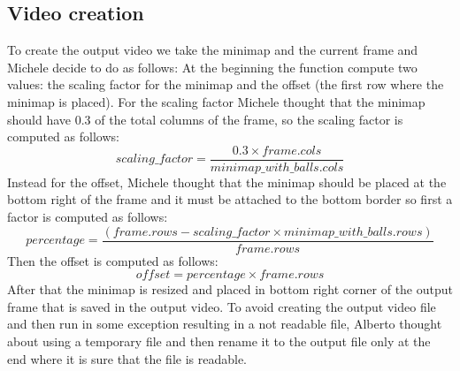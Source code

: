 \subsection{Video creation}
To create the output video we take the minimap and the current frame and Michele decide to do as follows:
At the beginning the function compute two values: the scaling factor for the minimap and the offset
(the first row where the minimap is placed). For the scaling factor Michele thought that
the minimap should have 0.3 of the total columns of the frame, so the scaling factor is computed as follows:
\begin{equation}
	scaling\_factor = \frac{0.3 \times frame.cols}{minimap\_with\_balls.cols}
\end{equation}
Instead for the offset, Michele thought that the minimap should be placed at the bottom right of the frame
and it must be attached to the bottom border so first a factor is computed as follows:
\begin{equation}
	percentage = \frac{(frame.rows - scaling\_factor \times minimap\_with\_balls.rows)}{frame.rows}
\end{equation}
Then the offset is computed as follows:
\begin{equation}
	offset = percentage \times frame.rows
\end{equation}
After that the minimap is resized and placed in bottom right corner of the output frame that
is saved in the output video.
To avoid creating the output video file and then run in some exception resulting in a not readable file,
Alberto thought about using a temporary file and then rename it to the output file only at the end where
it is sure that the file is readable.
